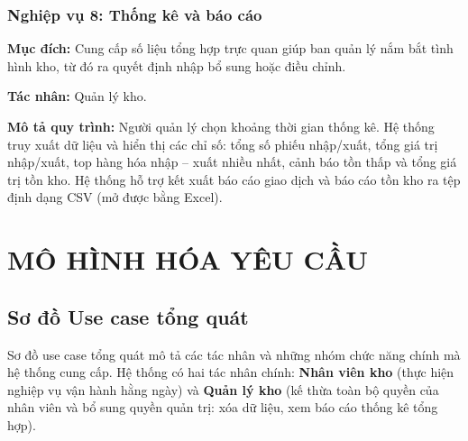 \documentclass[12pt,a4paper]{report}
\begin{document}
\subsection{Nghiệp vụ 8: Thống kê và báo cáo}
\textbf{Mục đích:} Cung cấp số liệu tổng hợp trực quan giúp ban quản lý nắm bắt
tình hình kho, từ đó ra quyết định nhập bổ sung hoặc điều chỉnh.

\noindent\textbf{Tác nhân:} Quản lý kho.

\noindent\textbf{Mô tả quy trình:} Người quản lý chọn khoảng thời gian thống kê.
Hệ thống truy xuất dữ liệu và hiển thị các chỉ số: tổng số phiếu nhập/xuất, tổng
giá trị nhập/xuất, top hàng hóa nhập -- xuất nhiều nhất, cảnh báo tồn thấp và
tổng giá trị tồn kho. Hệ thống hỗ trợ kết xuất báo cáo giao dịch và báo cáo tồn
kho ra tệp định dạng CSV (mở được bằng Excel).

\chapter{MÔ HÌNH HÓA YÊU CẦU}

\section{Sơ đồ Use case tổng quát}

Sơ đồ use case tổng quát mô tả các tác nhân và những nhóm chức năng chính mà hệ
thống cung cấp. Hệ thống có hai tác nhân chính: \textbf{Nhân viên kho} (thực
hiện nghiệp vụ vận hành hằng ngày) và \textbf{Quản lý kho} (kế thừa toàn bộ
quyền của nhân viên và bổ sung quyền quản trị: xóa dữ liệu, xem báo cáo thống
kê tổng hợp).
\end{document}
